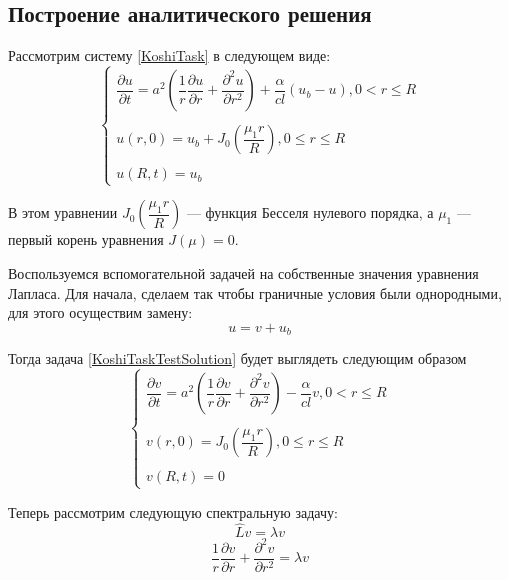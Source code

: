 \documentclass[a4paper,12pt,russian, fleqn]{extreport}
\begin{document}
	\subsection{Построение аналитического решения}
	Рассмотрим систему \eqref{KoshiTask} в следующем виде:
	\begin{equation}\label{KoshiTaskTestSolution}
		\left \{\begin{array}{l}
		\dfrac{\partial u}{\partial t} = a^2 \left ( \dfrac{1}{r}\dfrac{\partial u}{\partial r} + \dfrac{\partial^2 u}{\partial r^2}\right ) + \dfrac{\alpha}{cl}(u_b - u), 0 < r \leq R\\
		\\
		u(r, 0) = u_b + J_0\left(\dfrac{\mu_1 r}{R}\right), 0 \leq r \leq R \\
		\\
		u(R, t) = u_b
		\end{array}\right.
	\end{equation}
	
	В этом уравнении $J_0 \left ( \dfrac{\mu_1 r}{R} \right)$ --- функция Бесселя нулевого порядка, а $\mu_1$ --- первый корень уравнения $J \left( \mu \right) = 0$.
	
	Воспользуемся вспомогательной задачей на собственные значения уравнения Лапласа. Для начала, сделаем так чтобы граничные условия были однородными, для этого осуществим замену:
	\begin{equation*}
	u = v + u_b
	\end{equation*}
	
	Тогда задача \eqref{KoshiTaskTestSolution} будет выглядеть следующим образом
	\begin{equation}\label{KoshiTaskTestSolutionUniform}
	\left \{\begin{array}{l}
	\dfrac{\partial v}{\partial t} = a^2 \left ( \dfrac{1}{r}\dfrac{\partial v}{\partial r} + \dfrac{\partial^2 v}{\partial r^2}\right ) - \dfrac{\alpha}{cl}v, 0 < r \leq R\\
	\\
	v(r, 0) = J_0\left(\dfrac{\mu_1 r}{R}\right), 0 \leq r \leq R \\
	\\
	v(R, t) = 0
	\end{array}\right.
	\end{equation}
	
	Теперь рассмотрим следующую спектральную задачу:
	\begin{equation*}
	\hat{L}v = \lambda v
	\end{equation*}
	\begin{equation*}
	\dfrac{1}{r}\dfrac{\partial v}{\partial r} + \dfrac{\partial^2 v}{\partial r^2} = \lambda v
	\end{equation*}
	
\end{document}
